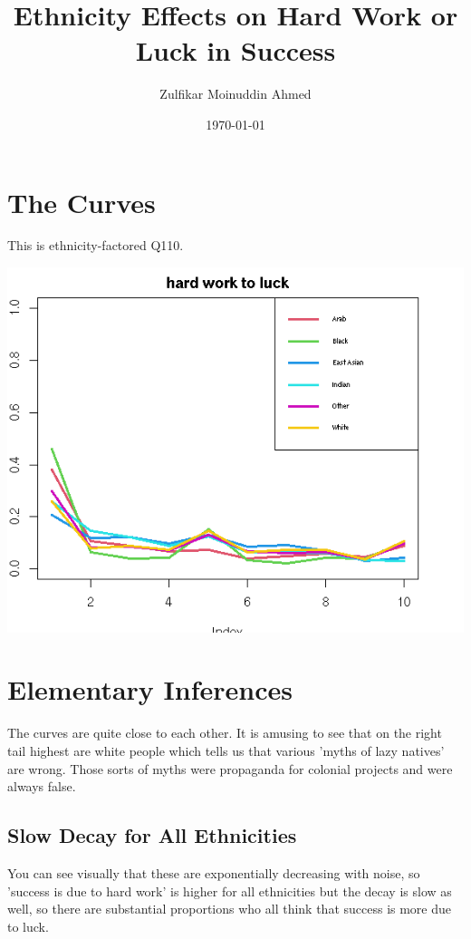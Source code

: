 \documentclass{amsart}
\title{Ethnicity Effects on Hard Work or Luck in Success}
\author{Zulfikar Moinuddin Ahmed}
\date{\today}
\begin{document}
\maketitle

\section{The Curves}

This is ethnicity-factored Q110.

\includegraphics[scale=0.8]{ethhardworkluck.jpeg}

\section{Elementary Inferences}

The curves are quite close to each other.  It is amusing to see that on the right tail highest are white people which tells us that various 'myths of lazy natives' are wrong.  Those sorts of myths were propaganda for colonial projects and were always false.  

\subsection{Slow Decay for All Ethnicities}

You can see visually that these are exponentially decreasing with noise, so 'success is due to hard work' is higher for all ethnicities but the decay is slow as well, so there are substantial proportions who all think that success is more due to luck.
\end{document}
